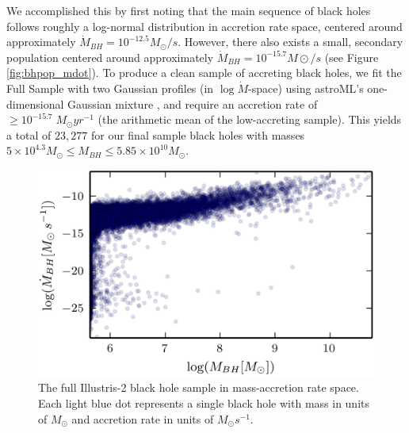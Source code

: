 We accomplished this by first noting that the main sequence of black
holes follows roughly a log-normal distribution in accretion rate
space, centered around approximately $\dot{M}_{BH}=10^{-12.5}M_{\odot}/s$.
However, there also exists a small, secondary population centered
around approximately $\dot{M}_{BH}=10^{-15.7}M\odot/s$ (see Figure
\ref{fig:bhpop_mdot}). To produce a clean sample of accreting black
holes, we fit the Full Sample with two Gaussian profiles (in $\log\dot{M}$-space)
using astroML's one-dimensional Gaussian mixture \citep{vanderplas2012},
and require an accretion rate of $\ge10^{-15.7}\; M_{\odot}yr^{-1}$
(the arithmetic mean of the low-accreting sample). This yields a total
of $23,277$ for our final sample black holes with masses $5\times10^{4.3}M_{\odot}\le M_{BH}\le5.85\times10^{10}M_{\odot}$.
\begin{figure}
\centering{}\includegraphics[clip]{Figures/Illustris2_bhpop_full}
\protect\caption{\label{fig:bhpop_full}The full Illustris-2 black hole sample in mass-accretion
rate space. Each light blue dot represents a single black hole with
mass in units of $M_{\odot}$ and accretion rate in units of $M_{\odot}s^{-1}$.}
\end{figure}
